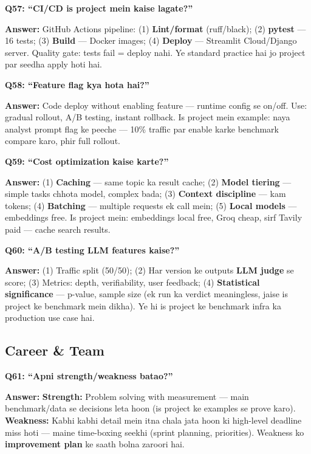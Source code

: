 \begin{interviewbox}
\textbf{Q57: ``CI/CD is project mein kaise lagate?''}

\textbf{Answer:} GitHub Actions pipeline: (1) \textbf{Lint/format} (ruff/black); (2) \textbf{pytest} --- 16 tests; (3) \textbf{Build} --- Docker images; (4) \textbf{Deploy} --- Streamlit Cloud/Django server. Quality gate: tests fail = deploy nahi. Ye standard practice hai jo project par seedha apply hoti hai.
\end{interviewbox}

\begin{interviewbox}
\textbf{Q58: ``Feature flag kya hota hai?''}

\textbf{Answer:} Code deploy without enabling feature --- runtime config se on/off. Use: gradual rollout, A/B testing, instant rollback. Is project mein example: naya analyst prompt flag ke peeche --- 10\% traffic par enable karke benchmark compare karo, phir full rollout.
\end{interviewbox}

\begin{interviewbox}
\textbf{Q59: ``Cost optimization kaise karte?''}

\textbf{Answer:} (1) \textbf{Caching} --- same topic ka result cache; (2) \textbf{Model tiering} --- simple tasks chhota model, complex bada; (3) \textbf{Context discipline} --- kam tokens; (4) \textbf{Batching} --- multiple requests ek call mein; (5) \textbf{Local models} --- embeddings free. Is project mein: embeddings local free, Groq cheap, sirf Tavily paid --- cache search results.
\end{interviewbox}

\begin{interviewbox}
\textbf{Q60: ``A/B testing LLM features kaise?''}

\textbf{Answer:} (1) Traffic split (50/50); (2) Har version ke outputs \textbf{LLM judge} se score; (3) Metrics: depth, verifiability, user feedback; (4) \textbf{Statistical significance} --- p-value, sample size (ek run ka verdict meaningless, jaise is project ke benchmark mein dikha). Ye hi is project ke benchmark infra ka production use case hai.
\end{interviewbox}

\subsection{Career \& Team}

\begin{interviewbox}
\textbf{Q61: ``Apni strength/weakness batao?''}

\textbf{Answer:} \textbf{Strength:} Problem solving with measurement --- main benchmark/data se decisions leta hoon (is project ke examples se prove karo). \textbf{Weakness:} Kabhi kabhi detail mein itna chala jata hoon ki high-level deadline miss hoti --- maine time-boxing seekhi (sprint planning, priorities). Weakness ko \textbf{improvement plan} ke saath bolna zaroori hai.
\end{interviewbox}

